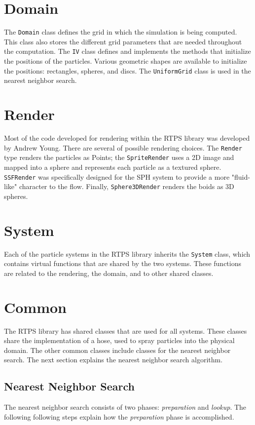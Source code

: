 \section{Domain}
The \texttt{Domain} class defines the grid in which the simulation is being computed. This class also stores the different grid parameters that are needed throughout the computation. The \texttt{IV} class defines and implements the methods that initialize the positions of the particles. Various geometric shapes are available to initialize the positions: rectangles, spheres, and discs. The \texttt{UniformGrid} class is used in the nearest neighbor search.

\section{Render}
Most of the code developed for rendering within the RTPS library was developed by Andrew Young\cite{andrewBlog}. There are several of possible rendering choices. The \texttt{Render} type renders the particles as Points; the \texttt{SpriteRender} uses a 2D image and mapped into a sphere and represents each particle as a textured sphere. \texttt{SSFRender} was specifically designed for the SPH system to provide a more "fluid-like" character to the flow. Finally, \texttt{Sphere3DRender} renders the boids as 3D spheres.  

\section{System}
Each of the particle systems in the RTPS library inherits the \texttt{System} class, which contains virtual functions that are shared by the two systems. These functions are related to the rendering,  the domain, and to other shared classes. 

\section{Common}\label{commonsection}
The RTPS library has shared classes that are used for all systems. These classes share the implementation of a hose, used to spray particles into the physical domain. The other common classes include classes for the nearest neighbor search. The next section explains the nearest neighbor search algorithm.

\subsection{Nearest Neighbor Search}
The nearest neighbor search consists of two phases: \textit{preparation} and \textit{lookup}. The following following steps explain how the \textit{preparation} phase is accomplished.

